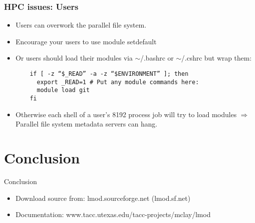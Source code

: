 \documentclass{beamer}
\begin{document}
\begin{frame}[fragile]
    \frametitle{HPC issues: Users}
  \begin{itemize}
    \item Users can overwork the parallel file system.
    \item Encourage your users to use {\color{blue}module setdefault}
    \item Or users should load their modules via $\sim$/.bashrc or
      $\sim$/.cshrc but wrap them:
    {\small
\begin{verbatim}
    if [ -z “$_READ” -a -z “$ENVIRONMENT” ]; then
      export _READ=1 # Put any module commands here:
      module load git
    fi
\end{verbatim}
}
\item Otherwise each shell of a user's 8192 process job will try to
  load modules $\Rightarrow$ Parallel file system metadata servers can hang.
  \end{itemize}
\end{frame}




\section{Conclusion}

\begin{frame}{Conclusion}
  \begin{itemize}
    \item Download source from: lmod.sourceforge.net (lmod.sf.net)
    \item Documentation: www.tacc.utexas.edu/tacc-projects/mclay/lmod
  \end{itemize}
\end{frame}
\end{document}
